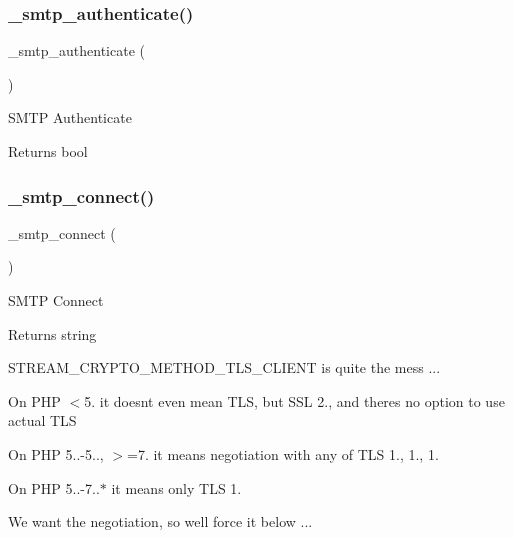 \subsubsection{\texorpdfstring{\+\_\+smtp\+\_\+authenticate()}{\_smtp\_authenticate()}}
{\footnotesize\ttfamily \+\_\+smtp\+\_\+authenticate (\begin{DoxyParamCaption}{ }\end{DoxyParamCaption})\hspace{0.3cm}{\ttfamily [protected]}}

S\+M\+TP Authenticate

\begin{DoxyReturn}{Returns}
bool 
\end{DoxyReturn}
\mbox{\label{class_c_i___email_ae57fde4883dcd1dec9f8999efef13f06}} 
\subsubsection{\texorpdfstring{\+\_\+smtp\+\_\+connect()}{\_smtp\_connect()}}
{\footnotesize\ttfamily \+\_\+smtp\+\_\+connect (\begin{DoxyParamCaption}{ }\end{DoxyParamCaption})\hspace{0.3cm}{\ttfamily [protected]}}

S\+M\+TP Connect

\begin{DoxyReturn}{Returns}
string 
\end{DoxyReturn}
S\+T\+R\+E\+A\+M\+\_\+\+C\+R\+Y\+P\+T\+O\+\_\+\+M\+E\+T\+H\+O\+D\+\_\+\+T\+L\+S\+\_\+\+C\+L\+I\+E\+NT is quite the mess ...


\begin{DoxyItemize}
\item On P\+HP $<$5. it doesn\textquotesingle{}t even mean T\+LS, but S\+SL 2., and there\textquotesingle{}s no option to use actual T\+LS
\item On P\+HP 5..-\/5.., $>$=7. it means negotiation with any of T\+LS 1., 1., 1.
\item On P\+HP 5..-\/7..$\ast$ it means only T\+LS 1.
\end{DoxyItemize}

We want the negotiation, so we\textquotesingle{}ll force it below ...\mbox{\label{class_c_i___email_a275593e37ea7d04035b5ce80d8934a13}} 
